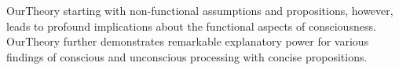 \documentclass[utf8]{article}
\begin{document}
    	    \ac{OurTheory} starting with non-functional assumptions and propositions, however, leads to profound implications about the functional aspects of consciousness. \ac{OurTheory} further demonstrates remarkable explanatory power for various findings of conscious and unconscious processing with concise propositions.
	    

        
        
\end{document}
